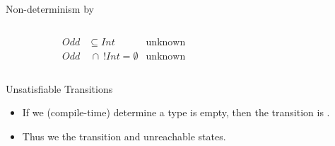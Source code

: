 \begin{frame}{Non-determinism by }
  \begin{columns}[T]
    \begin{column}{0.35\textwidth}
      \centering
      \begin{align*}
        Odd&\subseteq Int &\text{unknown}\\
        Odd&~\cap~ !Int = \emptyset &\text{unknown}
      \end{align*}
      \scalebox{1.0}{}%
    \end{column}%
    \begin{column}{0.7\textwidth}
    \end{column}
  \end{columns}
\end{frame}








\newsavebox\classbox
\begin{lrbox}{\classbox}
  \begin{minipage}{7cm}
    
  \end{minipage}
\end{lrbox}

\begin{frame}{Unsatisfiable Transitions}

  \scalebox{0.8}{}
  \begin{itemize}
  \item If we (compile-time) determine a type is empty, then the transition is .
  \item Thus we  the transition and unreachable states.

  \end{itemize}
\end{frame}


